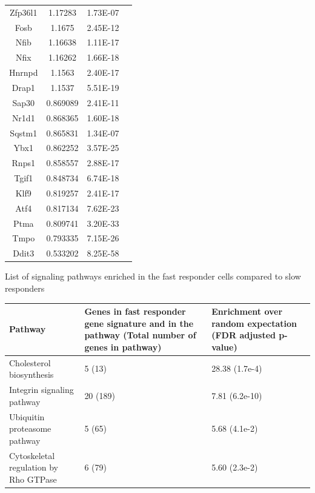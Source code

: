 \begin{supptable}[p]
\begin{tabular}{ cccc }
Zfp36l1 & 1.17283 & 1.73E-07 \\
Fosb & 1.1675 & 2.45E-12 \\
Nfib & 1.16638 & 1.11E-17 \\
Nfix & 1.16262 & 1.66E-18 \\
Hnrnpd & 1.1563 & 2.40E-17 \\
Drap1 & 1.1537 & 5.51E-19 \\
Sap30 & 0.869089 & 2.41E-11 \\
Nr1d1 & 0.868365 & 1.60E-18 \\
Sqstm1 & 0.865831 & 1.34E-07 \\
Ybx1 & 0.862252 & 3.57E-25 \\
Rnps1 & 0.858557 & 2.88E-17 \\
Tgif1 & 0.848734 & 6.74E-18 \\
Klf9 & 0.819257 & 2.41E-17 \\
Atf4 & 0.817134 & 7.62E-23 \\
Ptma & 0.809741 & 3.20E-33 \\
Tmpo & 0.793335 & 7.15E-26 \\
Ddit3 & 0.533202 & 8.25E-58 \\
\bottomrule
\end{tabular}
\label{tab:hh_tableS1}
\end{supptable}

\begin{supptable}[p]
\centering
\caption{List of signaling pathways enriched in the fast responder cells compared to slow responders}
\begin{tabular}{ p{3cm}p{3cm}p{3cm} }
\toprule
\textbf{Pathway} & \textbf{Genes in fast responder gene signature and in the pathway (Total number of genes in pathway)} & \textbf{Enrichment over random expectation (FDR adjusted p-value)} \\
\midrule
Cholesterol biosynthesis & 5 (13) & 28.38 (1.7e-4) \\
Integrin signaling pathway & 20 (189) & 7.81 (6.2e-10) \\
Ubiquitin proteasome pathway & 5 (65) & 5.68 (4.1e-2) \\
Cytoskeletal regulation by Rho GTPase & 6 (79) & 5.60 (2.3e-2) \\
\bottomrule
\end{tabular}
\label{tab:hh_tableS2}
\end{supptable}


